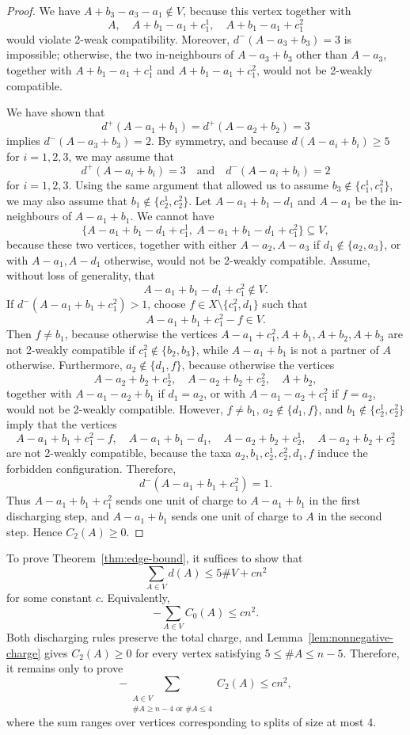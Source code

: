 \documentclass[11pt]{article}
\begin{document}
\begin{proof}
		We have $A+b_3-a_3-a_1\notin V$, because this vertex together with
		\[
		A,\quad A+b_1-a_1+c_1^1,\quad A+b_1-a_1+c_1^2
		\]
		would violate 2-weak compatibility. Moreover, $d^-(A-a_3+b_3)=3$ is impossible; otherwise, the two in-neighbours of $A-a_3+b_3$ other than $A-a_3$, together with $A+b_1-a_1+c_1^1$ and $A+b_1-a_1+c_1^2$, would not be 2-weakly compatible.
		
		We have shown that
		\[
		d^+(A-a_1+b_1)=d^+(A-a_2+b_2)=3
		\]
		implies $d^-(A-a_3+b_3)=2$. By symmetry, and because $d(A-a_i+b_i)\ge 5$ for $i=1,2,3$, we may assume that
		\[
		d^+(A-a_i+b_i)=3\quad\text{and}\quad d^-(A-a_i+b_i)=2
		\]
		for $i=1,2,3$. Using the same argument that allowed us to assume $b_3\notin\{c_1^1,c_1^2\}$, we may also assume that $b_1\notin\{c_2^1,c_2^2\}$. Let $A-a_1+b_1-d_1$ and $A-a_1$ be the in-neighbours of $A-a_1+b_1$. We cannot have
		\[
		\{A-a_1+b_1-d_1+c_1^1,\ A-a_1+b_1-d_1+c_1^2\}\subseteq V,
		\]
		because these two vertices, together with either $A-a_2,A-a_3$ if $d_1\notin\{a_2,a_3\}$, or with $A-a_1,A-d_1$ otherwise, would not be 2-weakly compatible. Assume, without loss of generality, that
		\[
		A-a_1+b_1-d_1+c_1^2\notin V.
		\]
		If $d^-(A-a_1+b_1+c_1^2)>1$, choose $f\in X\setminus\{c_1^2,d_1\}$ such that
		\[
		A-a_1+b_1+c_1^2-f\in V.
		\]
		Then $f\ne b_1$, because otherwise the vertices $A-a_1+c_1^2,A+b_1,A+b_2,A+b_3$ are not 2-weakly compatible if $c_1^2\notin\{b_2,b_3\}$, while $A-a_1+b_1$ is not a partner of $A$ otherwise. Furthermore, $a_2\notin\{d_1,f\}$, because otherwise the vertices
		\[
		A-a_2+b_2+c_2^1,\quad A-a_2+b_2+c_2^2,\quad A+b_2,
		\]
		together with $A-a_1-a_2+b_1$ if $d_1=a_2$, or with $A-a_1-a_2+c_1^2$ if $f=a_2$, would not be 2-weakly compatible. However, $f\ne b_1$, $a_2\notin\{d_1,f\}$, and $b_1\notin\{c_2^1,c_2^2\}$ imply that the vertices
		\[
		A-a_1+b_1+c_1^2-f,\quad A-a_1+b_1-d_1,\quad A-a_2+b_2+c_2^1,\quad A-a_2+b_2+c_2^2
		\]
		are not 2-weakly compatible, because the taxa $a_2,b_1,c_2^1,c_2^2,d_1,f$ induce the forbidden configuration. Therefore,
		\[
		d^-(A-a_1+b_1+c_1^2)=1.
		\]
		Thus $A-a_1+b_1+c_1^2$ sends one unit of charge to $A-a_1+b_1$ in the first discharging step, and $A-a_1+b_1$ sends one unit of charge to $A$ in the second step. Hence $C_2(A)\ge 0$.
	\end{proof}
	
	To prove Theorem~\ref{thm:edge-bound}, it suffices to show that
	\[
	\sum_{A\in V}d(A)\le 5\#V+cn^2
	\]
	for some constant $c$. Equivalently,
	\[
	-\sum_{A\in V}C_0(A)\le cn^2.
	\]
	Both discharging rules preserve the total charge, and Lemma~\ref{lem:nonnegative-charge} gives $C_2(A)\ge 0$ for every vertex satisfying $5\le\#A\le n-5$. Therefore, it remains only to prove
	\[
	-\sum_{\substack{A\in V\\ \#A\ge n-4\text{ or }\#A\le 4}}C_2(A)\le cn^2,
	\]
	where the sum ranges over vertices corresponding to splits of size at most 4.
	
\end{document}
